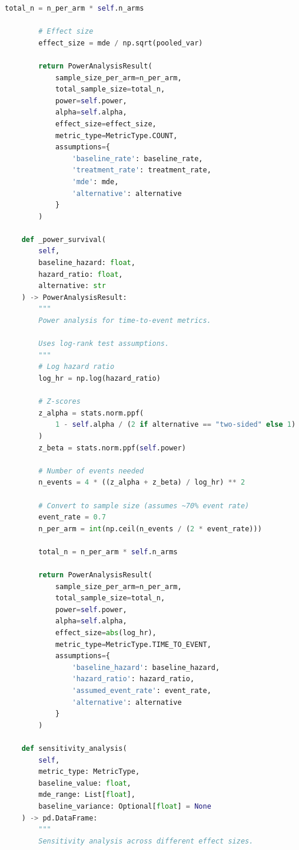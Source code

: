 \begin{lstlisting}[language=Python, caption={Comprehensive Power Analysis}]
        total_n = n_per_arm * self.n_arms

        # Effect size
        effect_size = mde / np.sqrt(pooled_var)

        return PowerAnalysisResult(
            sample_size_per_arm=n_per_arm,
            total_sample_size=total_n,
            power=self.power,
            alpha=self.alpha,
            effect_size=effect_size,
            metric_type=MetricType.COUNT,
            assumptions={
                'baseline_rate': baseline_rate,
                'treatment_rate': treatment_rate,
                'mde': mde,
                'alternative': alternative
            }
        )

    def _power_survival(
        self,
        baseline_hazard: float,
        hazard_ratio: float,
        alternative: str
    ) -> PowerAnalysisResult:
        """
        Power analysis for time-to-event metrics.

        Uses log-rank test assumptions.
        """
        # Log hazard ratio
        log_hr = np.log(hazard_ratio)

        # Z-scores
        z_alpha = stats.norm.ppf(
            1 - self.alpha / (2 if alternative == "two-sided" else 1)
        )
        z_beta = stats.norm.ppf(self.power)

        # Number of events needed
        n_events = 4 * ((z_alpha + z_beta) / log_hr) ** 2

        # Convert to sample size (assumes ~70% event rate)
        event_rate = 0.7
        n_per_arm = int(np.ceil(n_events / (2 * event_rate)))

        total_n = n_per_arm * self.n_arms

        return PowerAnalysisResult(
            sample_size_per_arm=n_per_arm,
            total_sample_size=total_n,
            power=self.power,
            alpha=self.alpha,
            effect_size=abs(log_hr),
            metric_type=MetricType.TIME_TO_EVENT,
            assumptions={
                'baseline_hazard': baseline_hazard,
                'hazard_ratio': hazard_ratio,
                'assumed_event_rate': event_rate,
                'alternative': alternative
            }
        )

    def sensitivity_analysis(
        self,
        metric_type: MetricType,
        baseline_value: float,
        mde_range: List[float],
        baseline_variance: Optional[float] = None
    ) -> pd.DataFrame:
        """
        Sensitivity analysis across different effect sizes.


\end{lstlisting}
